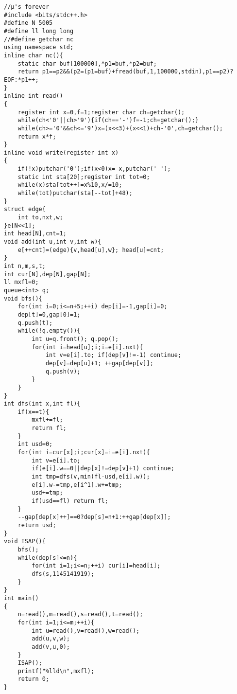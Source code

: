 \begin{verbatim}
//μ's forever
#include <bits/stdc++.h>
#define N 5005
#define ll long long
//#define getchar nc
using namespace std;
inline char nc(){
    static char buf[100000],*p1=buf,*p2=buf;
    return p1==p2&&(p2=(p1=buf)+fread(buf,1,100000,stdin),p1==p2)?EOF:*p1++;
}
inline int read()
{
    register int x=0,f=1;register char ch=getchar();
    while(ch<'0'||ch>'9'){if(ch=='-')f=-1;ch=getchar();}
    while(ch>='0'&&ch<='9')x=(x<<3)+(x<<1)+ch-'0',ch=getchar();
    return x*f;
}
inline void write(register int x)
{
    if(!x)putchar('0');if(x<0)x=-x,putchar('-');
    static int sta[20];register int tot=0;
    while(x)sta[tot++]=x%10,x/=10;
    while(tot)putchar(sta[--tot]+48);
}
struct edge{
    int to,nxt,w;
}e[N<<1];
int head[N],cnt=1;
void add(int u,int v,int w){
    e[++cnt]=(edge){v,head[u],w}; head[u]=cnt;
}
int n,m,s,t;
int cur[N],dep[N],gap[N];
ll mxfl=0;
queue<int> q;
void bfs(){
    for(int i=0;i<=n+5;++i) dep[i]=-1,gap[i]=0;
    dep[t]=0,gap[0]=1;
    q.push(t);
    while(!q.empty()){
        int u=q.front(); q.pop();
        for(int i=head[u];i;i=e[i].nxt){
            int v=e[i].to; if(dep[v]!=-1) continue;
            dep[v]=dep[u]+1; ++gap[dep[v]];
            q.push(v);
        }
    }
}
int dfs(int x,int fl){
    if(x==t){
        mxfl+=fl;
        return fl;
    }
    int usd=0;
    for(int i=cur[x];i;cur[x]=i=e[i].nxt){
        int v=e[i].to;
        if(e[i].w==0||dep[x]!=dep[v]+1) continue;
        int tmp=dfs(v,min(fl-usd,e[i].w));
        e[i].w-=tmp,e[i^1].w+=tmp;
        usd+=tmp;
        if(usd==fl) return fl;
    }
    --gap[dep[x]++]==0?dep[s]=n+1:++gap[dep[x]];
    return usd;
}
void ISAP(){
    bfs();
    while(dep[s]<=n){
        for(int i=1;i<=n;++i) cur[i]=head[i];
        dfs(s,1145141919);
    }
}
int main()
{
    n=read(),m=read(),s=read(),t=read();
    for(int i=1;i<=m;++i){
        int u=read(),v=read(),w=read();
        add(u,v,w);
        add(v,u,0);
    }
    ISAP();
    printf("%lld\n",mxfl);
    return 0;
}
\end{verbatim}

